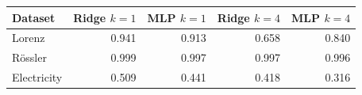 \begin{tabular}{lrrrr}
\toprule
Dataset & Ridge $k=1$ & MLP $k=1$ & Ridge $k=4$ & MLP $k=4$ \\
\midrule
Lorenz & 0.941 & 0.913 & 0.658 & 0.840 \\
R\"ossler & 0.999 & 0.997 & 0.997 & 0.996 \\
Electricity & 0.509 & 0.441 & 0.418 & 0.316 \\
\bottomrule
\end{tabular}

